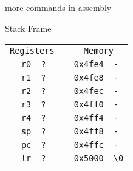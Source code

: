 




\begin{frame}{more commands in assembly}




\end{frame}






\begin{frame}{Stack Frame}
	\begin{alltt}
		\begin{tabular}{ r | l p{5mm} r | l }
			\multicolumn{2}{c}{Registers} &   & \multicolumn{2}{c}{Memory}                              \\
			r0                            & ? &                            & 0x4fe4 & -                 \\
			r1                            & ? &                            & 0x4fe8 & -                 \\
			r2                            & ? &                            & 0x4fec & -                 \\
			r3                            & ? &                            & 0x4ff0 & -                 \\
			r4                            & ? &                            & 0x4ff4 & -                 \\
			sp                            & ? &                            & 0x4ff8 & -                 \\
			pc                            & ? &                            & 0x4ffc & -                 \\
			lr                            & ? &                            & 0x5000 & {\textbackslash}0 \\
		\end{tabular}
	\end{alltt}
\end{frame}
